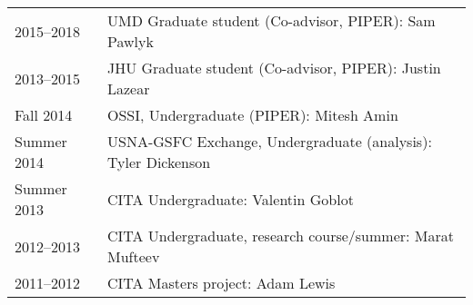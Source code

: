 {\begin{tabular}{l p{12cm}}
2015--2018 & UMD Graduate student (Co-advisor, PIPER): Sam Pawlyk \\
2013--2015 & JHU Graduate student (Co-advisor, PIPER): Justin Lazear \\
Fall 2014 & OSSI, Undergraduate (PIPER): Mitesh Amin \\
Summer 2014 & USNA-GSFC Exchange, Undergraduate (analysis): Tyler Dickenson \\
Summer 2013 & CITA Undergraduate: Valentin Goblot \\
2012--2013 & CITA Undergraduate, research course/summer: Marat Mufteev \\
2011--2012 & CITA Masters project: Adam Lewis \\
\end{tabular} \\~\\~\\
}


